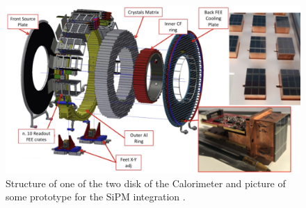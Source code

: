 \documentclass[12pt,a4paper,openright, oneside, titlepage]{book} %
\begin{document}
\begin{figure}[h!]
\centering
\includegraphics[scale=0.8]{mu2e_calorimeter_disk_2}
\caption[Disk of the calorimeter]{Structure of one of the two disk of the Calorimeter and picture of some prototype for the SiPM integration \cite{Calorimeter:2020}.}
\label{_mu2e_calorimeter_disk}
\end{figure}
\end{document}
